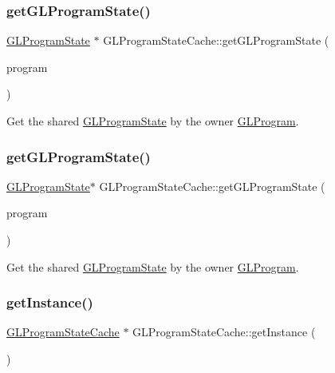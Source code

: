 \subsubsection{\texorpdfstring{get\+G\+L\+Program\+State()}{getGLProgramState()}\hspace{0.1cm}{\footnotesize\ttfamily [1/2]}}
{\footnotesize\ttfamily \hyperlink{classGLProgramState}{G\+L\+Program\+State} $\ast$ G\+L\+Program\+State\+Cache\+::get\+G\+L\+Program\+State (\begin{DoxyParamCaption}\item[{\hyperlink{classGLProgram}{G\+L\+Program} $\ast$}]{program }\end{DoxyParamCaption})}

Get the shared \hyperlink{classGLProgramState}{G\+L\+Program\+State} by the owner \hyperlink{classGLProgram}{G\+L\+Program}. \mbox{\label{classGLProgramStateCache_a16499f031722f40f5b8bd35310336f10}} 
\subsubsection{\texorpdfstring{get\+G\+L\+Program\+State()}{getGLProgramState()}\hspace{0.1cm}{\footnotesize\ttfamily [2/2]}}
{\footnotesize\ttfamily \hyperlink{classGLProgramState}{G\+L\+Program\+State}$\ast$ G\+L\+Program\+State\+Cache\+::get\+G\+L\+Program\+State (\begin{DoxyParamCaption}\item[{\hyperlink{classGLProgram}{G\+L\+Program} $\ast$}]{program }\end{DoxyParamCaption})}

Get the shared \hyperlink{classGLProgramState}{G\+L\+Program\+State} by the owner \hyperlink{classGLProgram}{G\+L\+Program}. \mbox{\label{classGLProgramStateCache_a5a3341fe25a92f64f28e04f4f17ae5d5}} 
\subsubsection{\texorpdfstring{get\+Instance()}{getInstance()}\hspace{0.1cm}{\footnotesize\ttfamily [1/2]}}
{\footnotesize\ttfamily \hyperlink{classGLProgramStateCache}{G\+L\+Program\+State\+Cache} $\ast$ G\+L\+Program\+State\+Cache\+::get\+Instance (\begin{DoxyParamCaption}\item[{void}]{ }\end{DoxyParamCaption})\hspace{0.3cm}{\ttfamily [static]}}

